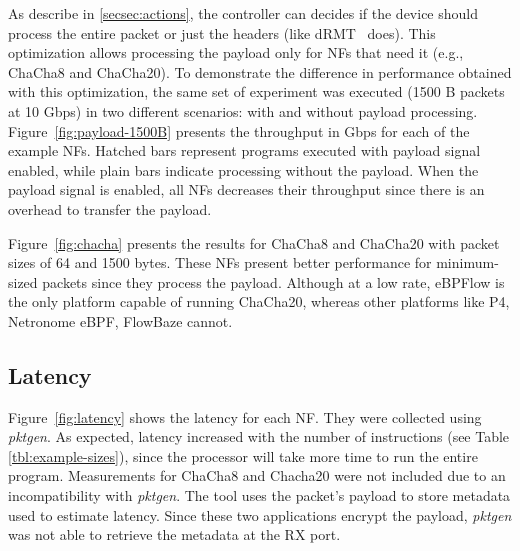As describe in \textsection\ref{secsec:actions}, the controller can decides if the device should process the entire packet or just the headers (like dRMT~\cite{chole2017drmt} does). 
This optimization allows processing the payload only for NFs that need it (e.g., ChaCha8 and ChaCha20).
To demonstrate the difference in performance obtained with this optimization, the same set of experiment was executed (1500 B packets at 10 Gbps) in two different scenarios: with and without payload processing. Figure~\ref{fig:payload-1500B} presents the throughput in Gbps for each of the example NFs. 
Hatched bars represent programs executed with payload signal enabled, while plain bars indicate processing without the payload. 
When the payload signal is enabled, all NFs decreases their throughput since there is an overhead to transfer the payload.



Figure~\ref{fig:chacha} presents the results for ChaCha8 and ChaCha20 with packet sizes of 64 and 1500 bytes. These NFs present better performance for minimum-sized packets since they process the payload.
Although at a low rate, eBPFlow is the only platform capable of running ChaCha20, whereas other platforms like P4, Netronome eBPF, FlowBaze cannot.



\subsection{Latency}

Figure~\ref{fig:latency} shows the latency for each NF. They were collected using \textit{pktgen}.
As expected, latency increased with the number of instructions (see Table \ref{tbl:example-sizes}), since the processor will take more time to run the entire program. Measurements for ChaCha8 and Chacha20 were not included due to an incompatibility with \textit{pktgen}. The tool uses the packet's payload to store metadata used to estimate latency. Since these two applications encrypt the payload, \textit{pktgen} was not able to retrieve the metadata at the RX port.


